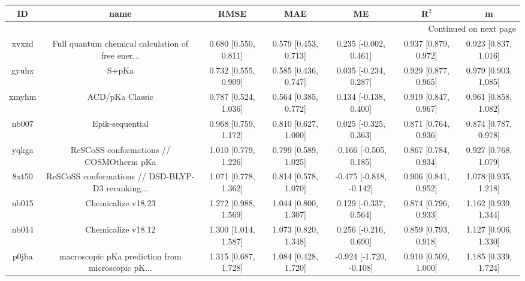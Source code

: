 \documentclass{article}
\begin{document}
\begin{center}
\begin{longtable}{|ccccccc|}
\toprule
    ID &                                               name &                  RMSE &                   MAE &                       ME &                 R$^2$ &                      m \\
\midrule
\endhead
\midrule
\multicolumn{7}{r}{{Continued on next page}} \\
\midrule
\endfoot

\bottomrule
\endlastfoot
 xvxzd &  Full quantum chemical calculation of free ener... &  0.680 [0.550, 0.811] &  0.579 [0.453, 0.713] &    0.235 [-0.002, 0.461] &  0.937 [0.879, 0.972] &   0.923 [0.837, 1.016] \\
 gyuhx &                                              S+pKa &  0.732 [0.555, 0.909] &  0.585 [0.436, 0.747] &    0.035 [-0.234, 0.287] &  0.929 [0.877, 0.965] &   0.979 [0.903, 1.085] \\
 xmyhm &                                    ACD/pKa Classic &  0.787 [0.524, 1.036] &  0.564 [0.385, 0.772] &    0.134 [-0.138, 0.400] &  0.919 [0.847, 0.967] &   0.961 [0.858, 1.082] \\
 nb007 &                                    Epik-sequential &  0.968 [0.759, 1.172] &  0.810 [0.627, 1.000] &    0.025 [-0.325, 0.363] &  0.871 [0.764, 0.936] &   0.874 [0.787, 0.978] \\
 yqkga &            ReSCoSS conformations // COSMOtherm pKa &  1.010 [0.779, 1.226] &  0.799 [0.589, 1.025] &   -0.166 [-0.505, 0.185] &  0.867 [0.784, 0.934] &   0.927 [0.768, 1.079] \\
 8xt50 &  ReSCoSS conformations // DSD-BLYP-D3 reranking... &  1.071 [0.778, 1.362] &  0.814 [0.578, 1.070] &  -0.475 [-0.818, -0.142] &  0.906 [0.841, 0.952] &   1.078 [0.935, 1.218] \\
 nb015 &                                 Chemicalize v18.23 &  1.272 [0.988, 1.569] &  1.044 [0.800, 1.307] &    0.129 [-0.337, 0.564] &  0.874 [0.796, 0.933] &   1.162 [0.939, 1.344] \\
 nb014 &                                 Chemicalize v18.12 &  1.300 [1.014, 1.587] &  1.073 [0.820, 1.348] &    0.256 [-0.216, 0.690] &  0.859 [0.793, 0.918] &   1.127 [0.906, 1.330] \\
 p0jba &  macroscopic pKa prediction from microscopic pK... &  1.315 [0.687, 1.728] &  1.084 [0.428, 1.720] &  -0.924 [-1.720, -0.108] &  0.910 [0.509, 1.000] &   1.185 [0.339, 1.724] \\

\end{longtable}
\end{center}
\end{document}
